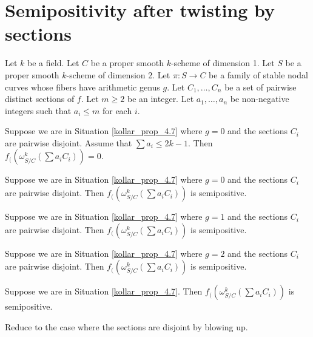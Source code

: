 \section{Semipositivity after twisting by sections}

\begin{situation}\label{kollar_prop_4.7}
Let $k$ be a field.
Let $C$ be a proper smooth $k$-scheme of dimension 1.
Let $S$ be a proper smooth $k$-scheme of dimension 2.
Let $\pi:S\to C$ be a family of stable nodal curves whose fibers have arithmetic genus $g$.
Let $C_1,\ldots,C_n$ be a set of pairwise distinct sections of $f$.
Let $m\ge2$ be an integer.
Let $a_1,\ldots,a_n$ be non-negative integers such that $a_i\le m$ for each $i$.
\end{situation}

\begin{lemma}
Suppose we are in Situation \ref{kollar_prop_4.7} where $g=0$ and the sections $C_i$ are pairwise disjoint.
Assume that $\sum a_i\le 2k-1$.
Then $f_{(}(\omega_{S/C}^{k}(\sum a_iC_i))=0$. 
\end{lemma}


\begin{lemma}
Suppose we are in Situation \ref{kollar_prop_4.7} where $g=0$ and the sections $C_i$ are pairwise disjoint.
Then $f_{(}(\omega_{S/C}^{k}(\sum a_iC_i))$ is semipositive.
\end{lemma}

\begin{lemma}
Suppose we are in Situation \ref{kollar_prop_4.7} where $g=1$ and the sections $C_i$ are pairwise disjoint.
Then $f_{(}(\omega_{S/C}^{k}(\sum a_iC_i))$ is semipositive.
\end{lemma}

\begin{lemma}
Suppose we are in Situation \ref{kollar_prop_4.7} where $g=2$ and the sections $C_i$ are pairwise disjoint.
Then $f_{(}(\omega_{S/C}^{k}(\sum a_iC_i))$ is semipositive.
\end{lemma}


\begin{lemma}
Suppose we are in Situation \ref{kollar_prop_4.7}.
Then $f_{(}(\omega_{S/C}^{k}(\sum a_iC_i))$ is semipositive.
\end{lemma}
\begin{lemma}
Reduce to the case where the sections are disjoint by blowing up.
\end{lemma}




